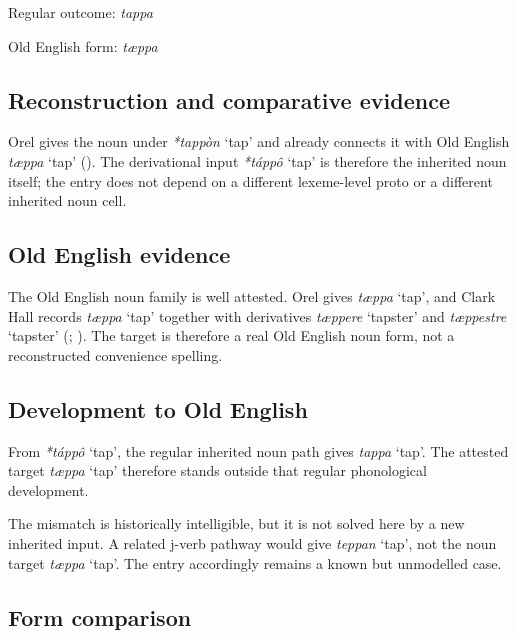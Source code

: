 \documentclass[
  british,
  a4paper,
  openany]{book}
\providecommand{\Recon}[1]{\emph{*#1}}
{\catcode`→=\active \global\def→{\ensuremath{\rightarrow}}}
\providecommand{\Recon}[1]{\emph{*#1}}
{\catcode`→=\active \global\def→{\ensuremath{\rightarrow}}}
\begin{document}
Regular outcome: \emph{tappa}

Old English form: \emph{tæppa}

\subsection{Reconstruction and comparative
evidence}\label{reconstruction-and-comparative-evidence-141}

Orel gives the noun under \Recon{tappòn} `tap' and already connects it
with Old English {\emph{tæppa}} `tap' (). The derivational input {\Recon{táppô} `tap'} is therefore
the inherited noun itself; the entry does not depend on a different
lexeme-level proto or a different inherited noun cell.

\subsection{Old English evidence}\label{old-english-evidence-141}

The Old English noun family is well attested. Orel gives {\emph{tæppa}}
`tap', and Clark Hall records {\emph{tæppa}} `tap' together with
derivatives \emph{tæppere} `tapster' and \emph{tæppestre} `tapster'
(;
). The target is
therefore a real Old English noun form, not a reconstructed convenience
spelling.

\subsection{Development to Old
English}\label{development-to-old-english-141}

From {\Recon{táppô} `tap'}, the regular inherited noun path gives
{\emph{tappa}} `tap'. The attested target {\emph{tæppa}} `tap' therefore
stands outside that regular phonological development.

The mismatch is historically intelligible, but it is not solved here by
a new inherited input. A related j-verb pathway would give
{\emph{teppan}} `tap', not the noun target {\emph{tæppa}} `tap'. The
entry accordingly remains a known but unmodelled case.

\subsection{Form comparison}\label{form-comparison-6}
\end{document}
